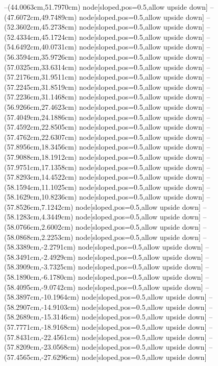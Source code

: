 --(44.0063cm,51.7970cm) node[sloped,pos=0.5,allow upside down]{\ArrowIn}
--(47.6072cm,49.7489cm) node[sloped,pos=0.5,allow upside down]{\ArrowIn}
--(52.3602cm,45.2738cm) node[sloped,pos=0.5,allow upside down]{\ArrowIn}
--(52.4334cm,45.1724cm) node[sloped,pos=0.5,allow upside down]{\arrowIn}
--(54.6492cm,40.0731cm) node[sloped,pos=0.5,allow upside down]{\ArrowIn}
--(56.3594cm,35.9726cm) node[sloped,pos=0.5,allow upside down]{\ArrowIn}
--(57.0325cm,33.6314cm) node[sloped,pos=0.5,allow upside down]{\ArrowIn}
--(57.2176cm,31.9511cm) node[sloped,pos=0.5,allow upside down]{\ArrowIn}
--(57.2245cm,31.8519cm) node[sloped,pos=0.5,allow upside down]{\arrowIn}
--(57.2236cm,31.1468cm) node[sloped,pos=0.5,allow upside down]{\arrowIn}
--(56.9266cm,27.4623cm) node[sloped,pos=0.5,allow upside down]{\ArrowIn}
--(57.4049cm,24.1886cm) node[sloped,pos=0.5,allow upside down]{\ArrowIn}
--(57.4592cm,22.8505cm) node[sloped,pos=0.5,allow upside down]{\ArrowIn}
--(57.4762cm,22.6307cm) node[sloped,pos=0.5,allow upside down]{\arrowIn}
--(57.8956cm,18.3456cm) node[sloped,pos=0.5,allow upside down]{\ArrowIn}
--(57.9088cm,18.1912cm) node[sloped,pos=0.5,allow upside down]{\arrowIn}
--(57.9751cm,17.1358cm) node[sloped,pos=0.5,allow upside down]{\ArrowIn}
--(57.8293cm,14.4522cm) node[sloped,pos=0.5,allow upside down]{\ArrowIn}
--(58.1594cm,11.1025cm) node[sloped,pos=0.5,allow upside down]{\ArrowIn}
--(58.1629cm,10.8236cm) node[sloped,pos=0.5,allow upside down]{\arrowIn}
--(57.8526cm,7.1242cm) node[sloped,pos=0.5,allow upside down]{\ArrowIn}
--(58.1283cm,4.3449cm) node[sloped,pos=0.5,allow upside down]{\ArrowIn}
--(58.0766cm,2.6002cm) node[sloped,pos=0.5,allow upside down]{\ArrowIn}
--(58.0868cm,2.2253cm) node[sloped,pos=0.5,allow upside down]{\arrowIn}
--(58.3389cm,-2.2791cm) node[sloped,pos=0.5,allow upside down]{\ArrowIn}
--(58.3491cm,-2.4929cm) node[sloped,pos=0.5,allow upside down]{\arrowIn}
--(58.3909cm,-3.7325cm) node[sloped,pos=0.5,allow upside down]{\ArrowIn}
--(58.1890cm,-6.1780cm) node[sloped,pos=0.5,allow upside down]{\ArrowIn}
--(58.4095cm,-9.0742cm) node[sloped,pos=0.5,allow upside down]{\ArrowIn}
--(58.3897cm,-10.1964cm) node[sloped,pos=0.5,allow upside down]{\ArrowIn}
--(58.2907cm,-14.9103cm) node[sloped,pos=0.5,allow upside down]{\ArrowIn}
--(58.2689cm,-15.3146cm) node[sloped,pos=0.5,allow upside down]{\arrowIn}
--(57.7771cm,-18.9168cm) node[sloped,pos=0.5,allow upside down]{\ArrowIn}
--(57.8431cm,-22.4561cm) node[sloped,pos=0.5,allow upside down]{\ArrowIn}
--(57.8209cm,-23.0568cm) node[sloped,pos=0.5,allow upside down]{\arrowIn}
--(57.4565cm,-27.6296cm) node[sloped,pos=0.5,allow upside down]{\ArrowIn}
